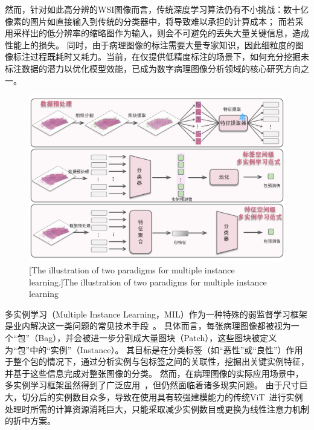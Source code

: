 然而，针对如此高分辨的WSI图像而言，传统深度学习算法仍有不小挑战：数十亿像素的图片如直接输入到传统的分类器中，将导致难以承担的计算成本；
而若采用采样出的低分辨率的缩略图作为输入，则会不可避免的丢失大量关键信息，造成性能上的损失。
同时，由于病理图像的标注需要大量专家知识，因此细粒度的图像标注过程既耗时又耗力。当前，在仅提供低精度标注的场景下，如何充分挖掘未标注数据的潜力以优化模型效能，已成为数字病理图像分析领域的核心研究方向之一。
\begin{figure}[h]
    \centering
    \includegraphics[width=\columnwidth]{figures/多实例学习范式.pdf}
    [The illustration of two paradigms for multiple instance learning.]{The illustration of two paradigms for multiple instance learning}
    \label{figure1: 多实例学习范式}
\end{figure}

多实例学习（Multiple Instance Learning，MIL）\cite{dietterich1997solving,herrera2016multiple}作为一种特殊的弱监督学习框架是业内解决这一类问题的常见技术手段~。
具体而言，每张病理图像都被视为一个“包”（Bag），并会被进一步分割成大量图块（Patch），这些图块被定义为“包”中的“实例”（Instance）。
其目标是在分类标签（如“恶性”或“良性”）作用于整个包的情况下，通过分析实例与包标签之间的关联性，挖掘出关键实例特征，并基于这些信息完成对整张图像的分类。
然而，在病理图像的实际应用场景中，多实例学习框架虽然得到了广泛应用~\cite{li2021dual,lu2021data,shao2021transmil,zhang2022dtfd,tang2024feature}，但仍然面临着诸多现实问题。
由于尺寸巨大，切分后的实例数目众多，导致在使用具有较强建模能力的传统ViT~\cite{dosovitskiy2020image}进行实例处理时所需的计算资源消耗巨大，只能采取减少实例数目或更换为线性注意力机制的折中方案。

